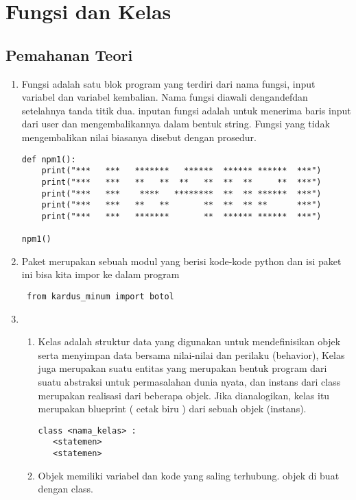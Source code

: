 \chapter{Fungsi dan Kelas}
\section{Pemahanan Teori}
\begin{enumerate}
\item Fungsi adalah satu blok program yang terdiri dari nama fungsi, input variabel dan variabel kembalian.  Nama fungsi diawali dengandefdan setelahnya tanda titik dua. inputan fungsi adalah untuk menerima baris input dari user dan mengembalikannya dalam bentuk string. Fungsi yang tidak mengembalikan nilai biasanya disebut dengan prosedur.
\begin{lstlisting}[caption=Contoh penggunaan fungsi,label={lst:Syntak fungsi}]
def npm1():
    print("***   ***   *******   ******  ****** ******  ***")
    print("***   ***   **   **  **   **  **  **     **  ***")
    print("***   ***    ****   ********  **  ** ******  ***")
    print("***   ***   **   **       **  **  ** **      ***")
    print("***   ***   *******       **  ****** ******  ***")
    
npm1()
\end{lstlisting}
\item Paket merupakan sebuah modul yang berisi kode-kode python dan isi paket ini bisa kita impor ke dalam program
\begin{lstlisting}
 from kardus_minum import botol
\end{lstlisting}
\item
\begin{enumerate}
\item Kelas adalah struktur data yang digunakan untuk mendefinisikan objek serta menyimpan data bersama nilai-nilai dan perilaku (behavior), Kelas juga merupakan suatu entitas yang merupakan bentuk program dari suatu abstraksi untuk permasalahan dunia nyata, dan instans dari class merupakan realisasi dari beberapa objek. Jika dianalogikan, kelas itu merupakan blueprint ( cetak biru ) dari sebuah objek (instans).
\begin{lstlisting}[caption=contoh class, label={lst:Syntak kelas}]
  class <nama_kelas> :
   <statemen>
   <statemen>
\end{lstlisting}
\item Objek memiliki variabel dan kode yang saling terhubung. objek di buat dengan class.


\end{enumerate}
\end{enumerate}
